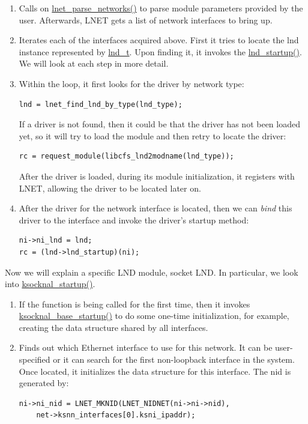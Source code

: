 \begin{enumerate}

\item Calls on \url{lnet_parse_networks()} to parse module parameters 
provided by the user. Afterwards, LNET gets a list of network interfaces to bring
up.

\item Iterates each of the interfaces acquired above. First it tries to locate
the lnd instance represented by \url{lnd_t}. Upon finding it, it invokes the
\url{lnd_startup()}. We will look at each step in more detail.

\item Within the loop, it first looks for the driver by network type:

\begin{Verbatim}
lnd = lnet_find_lnd_by_type(lnd_type);
\end{Verbatim}

If a driver is not found, then it could be that the driver has not been loaded
yet, so it will try to load the module and then retry to locate the driver:

\begin{Verbatim}
rc = request_module(libcfs_lnd2modname(lnd_type));
\end{Verbatim}

After the driver is loaded, during its module initialization, it registers with
LNET, allowing the driver to be located later on.

\item After the driver for the network interface is located, then we can
\textit{bind} this driver to the interface and invoke the driver's startup
method:

\begin{Verbatim}
ni->ni_lnd = lnd;
rc = (lnd->lnd_startup)(ni);
\end{Verbatim}

\end{enumerate}

Now we will explain a specific LND module, socket LND. In particular, we look
into \url{ksocknal_startup()}.

\begin{enumerate}

\item If the function is being called for the first time, then it invokes
\url{ksocknal_base_startup()} to do some one-time initialization, for
example, creating the data structure shared by all interfaces.

\item Finds out which Ethernet interface to use for this network. It can be
user-specified or it can search for the first non-loopback interface in the
system.  Once located, it initializes the data structure for this interface.
The nid is generated by:

\begin{Verbatim}
ni->ni_nid = LNET_MKNID(LNET_NIDNET(ni->ni->nid),
    net->ksnn_interfaces[0].ksni_ipaddr);
\end{Verbatim}

\end{enumerate}

